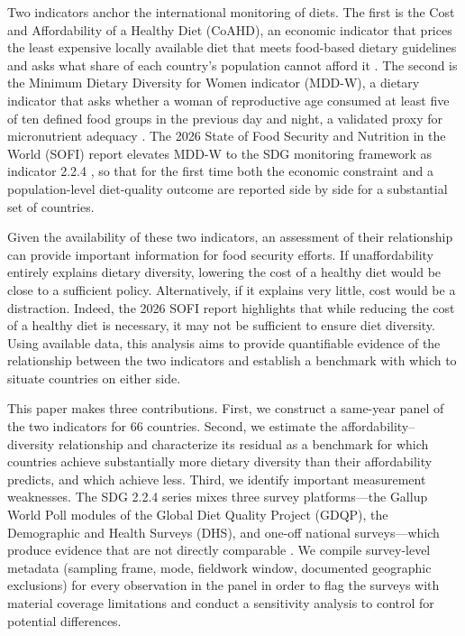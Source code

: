 \documentclass[11pt]{article}
\begin{document}
Two indicators anchor the international monitoring of diets. The first is the Cost and Affordability of a Healthy Diet (CoAHD), an economic indicator that prices the least expensive locally available diet that meets food-based dietary guidelines and asks what share of each country's population cannot afford it \citep{herforth2020, bai2021}. The second is the Minimum Dietary Diversity for Women indicator (MDD-W), a dietary indicator that asks whether a woman of reproductive age consumed at least five of ten defined food groups in the previous day and night, a validated proxy for micronutrient adequacy \citep{arimond2010, martinprevel2015, fao2021}. The 2026 State of Food Security and Nutrition in the World (SOFI) report elevates MDD-W to the SDG monitoring framework as indicator 2.2.4 \citep{fao2026}, so that for the first time both the economic constraint and a population-level diet-quality outcome are reported side by side for a substantial set of countries.

Given the availability of these two indicators, an assessment of their relationship can provide important information for food security efforts. If unaffordability entirely explains dietary diversity, lowering the cost of a healthy diet would be close to a sufficient policy.  Alternatively, if it explains very little, cost would be a distraction. Indeed, the 2026 SOFI report highlights that while reducing the cost of a healthy diet is necessary, it may not be sufficient to ensure diet diversity.  Using available data, this analysis aims to provide quantifiable evidence of the relationship between the two indicators and establish a benchmark with which to situate countries on either side.

This paper makes three contributions. First, we construct a same-year panel of the two indicators for 66 countries. Second, we estimate the affordability--diversity relationship and characterize its residual as a benchmark for which countries achieve substantially more dietary diversity than their affordability predicts, and which achieve less. Third, we identify important measurement weaknesses. The SDG 2.2.4 series mixes three survey platforms---the Gallup World Poll modules of the Global Diet Quality Project (GDQP), the Demographic and Health Surveys (DHS), and one-off national surveys---which produce evidence that are not directly comparable \citep{hanleycook2025}. We compile survey-level metadata (sampling frame, mode, fieldwork window, documented geographic exclusions) for every observation in the panel in order to flag the surveys with material coverage limitations and conduct a sensitivity analysis to control for potential differences.
\end{document}
